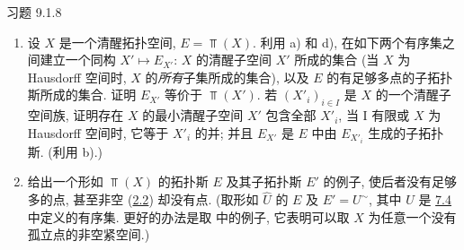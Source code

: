 \begin{enonce*}[remark]{习题 9.1.8}
\begin{enumerate}
\item 设 $X$ 是一个清醒拓扑空间, $E=\Top(X)$.
利用 a) 和 d), 在如下两个有序集之间建立一个同构 $X'\mapsto E_{X'}$:
$X$ 的清醒子空间 $X'$ 所成的集合
(\ie 当 $X$ 为 Hausdorff 空间时, $X$ 的\emph{所有}子集所成的集合),
以及 $E$ 的有足够多点的子拓扑斯所成的集合.
证明 $E_{X'}$ 等价于 $\Top(X')$.
若 $(X'_i)_{i\in I}$ 是 $X$ 的一个清醒子空间族,
证明存在 $X$ 的最小清醒子空间 $X'$ 包含全部 $X'_i$,
当 I 有限或 $X$ 为 Hausdorff 空间时, 它等于 $X'_i$ 的并;
并且 $E_{X'}$ 是 $E$ 中由 $E_{X'_i}$ 生成的子拓扑斯.
(利用 b).)

\item 给出一个形如 $\Top(X)$ 的拓扑斯 $E$ 及其子拓扑斯 $E'$ 的例子,
使后者没有足够多的点,
甚至非空 (\hyperref[IV.subsec2.2]{2.2}) 却没有点.
(取形如 $\widehat{U}$ 的 $E$ 及 $E'=U^{\sim}$,
其中 $U$ 是 \hyperref[IV.subsec7.4]{7.4} 中定义的有序集.
更好的办法是取  中的例子,
它表明可以取 $X$ 为任意一个没有孤立点的非空紧空间.)
\end{enumerate}
\end{enonce*}



